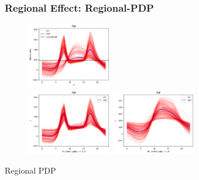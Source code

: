 \documentclass{beamer}
\begin{document}
\begin{frame}
  \frametitle{Regional Effect: Regional-PDP}
  \begin{figure}[ht]
    \centering
    \includegraphics[width=0.33\textwidth]{./figures/bike_sharing_global_pdp_heterogeneity.png}\\
    \includegraphics[width=0.33\textwidth]{./figures/bike_sharing_regional_pdp_workingdays.png}
    \includegraphics[width=0.33\textwidth]{./figures/bike_sharing_regional_pdp_weekends.png}
  \end{figure}
  \noindent\makebox[\linewidth]{\rule{\paperwidth}{0.4pt}}
  Regional PDP~\citep{herbinger_repid_2022}
\end{frame}
\end{document}
